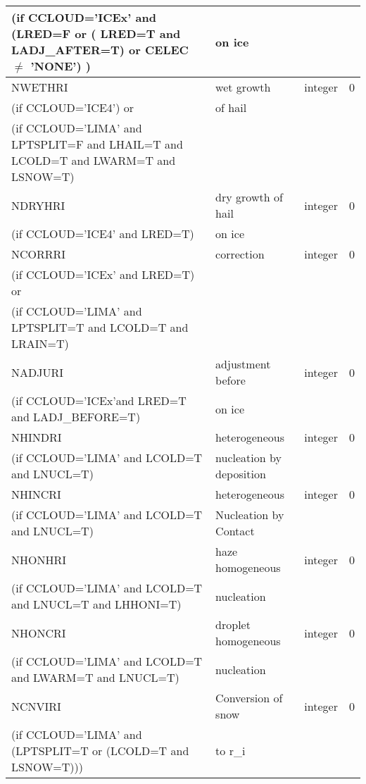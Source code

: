 \begin{longtable} {|p{}|p{}|>{\centering}p{}|p{}<{\centering}|}
(if CCLOUD='ICEx' and (LRED=F or ( LRED=T and LADJ\_AFTER=T) or CELEC $\neq$ 'NONE')  ) &  on ice&   &  \\\hline
NWETHRI &   wet growth  & integer  &  0 \index{NWETHRI!\innam{NAM\_BU\_RRI}}\\ \nopagebreak
(if CCLOUD='ICE4') or &of hail &   &  \\
(if CCLOUD='LIMA' and LPTSPLIT=F and LHAIL=T and LCOLD=T and LWARM=T and LSNOW=T) & &   &  \\\hline
NDRYHRI&    dry growth of hail& integer  &  0 \index{NDRYHRI!\innam{NAM\_BU\_RRI}}\\ \nopagebreak
(if CCLOUD='ICE4' and LRED=T) &  on ice&   &  \\\hline
NCORRRI&   correction & integer  &  0 \index{NCORRRI!\innam{NAM\_BU\_RRI}}\\ \nopagebreak
(if CCLOUD='ICEx' and LRED=T) or & &   &  \\ \nopagebreak
(if CCLOUD='LIMA' and LPTSPLIT=T and LCOLD=T and LRAIN=T) & &   &  \\\hline
NADJURI&   adjustment before & integer  &  0 \index{NADJURI!\innam{NAM\_BU\_RRI}}\\ \nopagebreak
(if CCLOUD='ICEx'and LRED=T and LADJ\_BEFORE=T) &  on ice&   &  \\\hline
NHINDRI &  heterogeneous     & integer  &  0 \index{NHINDRI!\innam{NAM\_BU\_RRI}}\\ \nopagebreak
(if CCLOUD='LIMA' and LCOLD=T and LNUCL=T) &nucleation by deposition &   &  \\\hline
NHINCRI & heterogeneous     & integer  &  0 \index{NHINCRI!\innam{NAM\_BU\_RRI}}\\ \nopagebreak
(if CCLOUD='LIMA' and LCOLD=T and LNUCL=T)   & Nucleation by Contact  &       &   \\\hline
NHONHRI & haze homogeneous     & integer  &  0 \index{NHONHRI!\innam{NAM\_BU\_RRI}}\\ \nopagebreak
(if CCLOUD='LIMA' and LCOLD=T and LNUCL=T and LHHONI=T) & nucleation  &   &  \\\hline
NHONCRI & droplet homogeneous     & integer  &  0 \index{NHONCRI!\innam{NAM\_BU\_RRI}}\\ \nopagebreak
(if CCLOUD='LIMA' and LCOLD=T and LWARM=T and LNUCL=T)   & nucleation   &       &   \\\hline
NCNVIRI & Conversion of snow     & integer  &  0 \index{NCNVIRI!\innam{NAM\_BU\_RRI}}\\ \nopagebreak
(if CCLOUD='LIMA' and (LPTSPLIT=T or (LCOLD=T and LSNOW=T))) &to r\_i &   &  \\\hline

\end{longtable}
